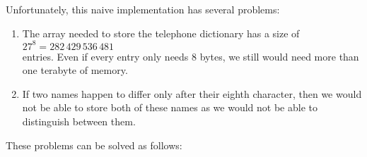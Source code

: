 \noindent
Unfortunately, this naive implementation has several problems: 
\begin{enumerate}
\item The array needed to store the telephone dictionary has a size of 
      \\[0.2cm]
      \hspace*{1.3cm} $27^8 = 282\,429\,536\,481$ \\[0.2cm]
      entries.  Even if every entry only needs 8 bytes, we still would need more than one terabyte
      of memory.
\item If two names happen to differ only after their eighth character, then we would not be able to
      store both of these names as we would not be able to distinguish between them.
\end{enumerate}
These problems can be solved as follows:
